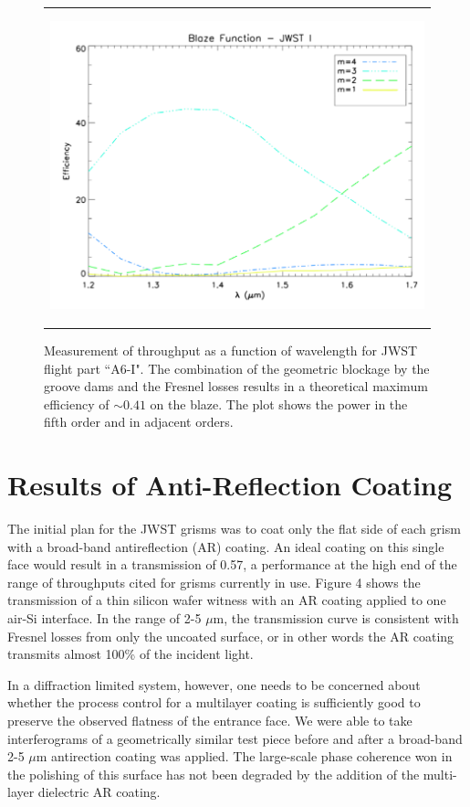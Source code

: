    \begin{figure}
   \begin{center}
   \begin{tabular}{c}
   \includegraphics[height=9cm]{chSPIE_2010_JWST/figs/A6I_transmission_nt2}
   \end{tabular}
   \end{center}
   \caption[JWST grism transmission] {\label{fig:im3}  Measurement of throughput as a function of wavelength for JWST flight part ``A6-I".  The combination of the geometric blockage by the groove dams and the Fresnel losses results in a theoretical maximum efficiency of $\sim 0.41$ on the blaze.  The plot shows the power in the fifth order and in adjacent orders.} 
   \end{figure} 

\section{Results of Anti-Reflection Coating}
The initial plan for the JWST grisms was to coat only the flat side of each grism with a broad-band antireflection (AR) coating.  An ideal coating on this single face would result in a transmission of 0.57, a performance at the high end of the range of throughputs cited for grisms currently in use.  Figure 4 shows the transmission of a thin silicon wafer witness with an AR coating applied to one air-Si interface.  In the range of 2-5 $\mu$m, the transmission curve is consistent with Fresnel losses from only the uncoated surface, or in other words the AR coating transmits almost 100\% of the incident light.  

In a diffraction limited system, however,  one needs to be concerned about whether the process control for a multilayer coating is sufficiently good to preserve the observed flatness of the entrance face.  We were able to take interferograms of a geometrically similar test piece before and after a broad-band 2-5 $\mu$m antirection coating was applied.  The large-scale phase coherence won in the polishing of this surface has not been degraded by the addition of the multi-layer dielectric AR coating.
   

